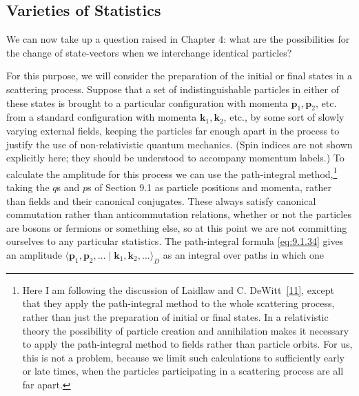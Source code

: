 
\subsection[Varieties of Statistics]{\texorpdfstring{Varieties of Statistics\protect\footnotemark}
 {Varieties of Statistics}}

We can now take up a question raised in Chapter 4: what are the possibilities
for the change of state-vectors when we interchange identical particles?

For this purpose, we will consider the preparation of the initial or final
states in a scattering process. Suppose that a set of indistinguishable
particles in either of these states is brought to a particular configuration
with momenta $\mathbf p_1,\mathbf p_2$, etc. from a standard configuration with
momenta $\mathbf k_1,\mathbf k_2$, etc., by some sort of slowly varying external
fields, keeping the particles far enough apart in the process to justify the
use of non-relativistic quantum mechanics. (Spin indices are not shown
explicitly here; they should be understood to accompany momentum labels.) To
calculate the amplitude for this process we can use the path-integral
method,\footnote{Here I am following the discussion of Laidlaw and C.
DeWitt~\hyperref[ref:9.11]{[11]}, except that they apply the path-integral method to the whole
scattering process, rather than just the preparation of initial or final
states. In a relativistic theory the possibility of particle creation and
annihilation makes it necessary to apply the path-integral method to fields
rather than particle orbits. For us, this is not a problem, because we limit
such calculations to sufficiently early or late times, when the particles
participating in a scattering process are all far apart.} taking the $q$s and
$p$s of Section 9.1 as particle positions and momenta, rather than fields and
their canonical conjugates. These always satisfy canonical commutation rather
than anticommutation relations, whether or not the particles are bosons or
fermions or something else, so at this point we are not committing ourselves
to any particular statistics. The path-integral formula \eqref{eq:9.1.34} gives an
amplitude
$\langle\mathbf p_1,\mathbf p_2,\ldots\mid
\mathbf k_1,\mathbf k_2,\ldots\rangle_D$ as an integral over paths in which one
